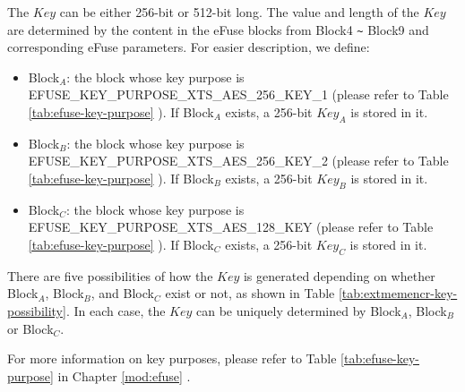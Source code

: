 \documentclass[main\_\_EN.tex]{subfiles}
\begin{document}
The \begin{math}\mathit{Key}\end{math} can be either 256-bit or 512-bit long. The value and length of the \begin{math}\mathit{Key}\end{math} are determined by the content in the eFuse blocks from Block4 \verb+~+ Block9 and corresponding eFuse parameters. For easier description, we define:
\begin{itemize}
    \item Block$_A$: the block whose key purpose is EFUSE\_KEY\_PURPOSE\_XTS\_AES\_256\_KEY\_1 (please refer to Table \ref{tab:efuse-key-purpose} \textit{}). If Block$_A$ exists, a 256-bit \begin{math}\mathit{Key}_{A}\end{math} is stored in it.
    \item Block$_B$: the block whose key purpose is EFUSE\_KEY\_PURPOSE\_XTS\_AES\_256\_KEY\_2 (please refer to Table \ref{tab:efuse-key-purpose} \textit{}). If Block$_B$ exists, a 256-bit \begin{math}\mathit{Key}_{B}\end{math} is stored in it.
    \item Block$_C$: the block whose key purpose is EFUSE\_KEY\_PURPOSE\_XTS\_AES\_128\_KEY (please refer to Table \ref{tab:efuse-key-purpose} \textit{}). If Block$_C$ exists, a 256-bit \begin{math}\mathit{Key}_{C}\end{math} is stored in it.
\end{itemize}

There are five possibilities of how the \begin{math}\mathit{Key}\end{math} is generated depending on whether Block$_A$, Block$_B$, and Block$_C$ exist or not, as shown in Table \ref{tab:extmemencr-key-possibility}. In each case, the \begin{math}\mathit{Key}\end{math} can be uniquely determined by Block$_A$, Block$_B$ or Block$_C$.




For more information on key purposes, please refer to Table \ref{tab:efuse-key-purpose} \textit{} in Chapter \ref{mod:efuse} \textit{}.
\end{document}

